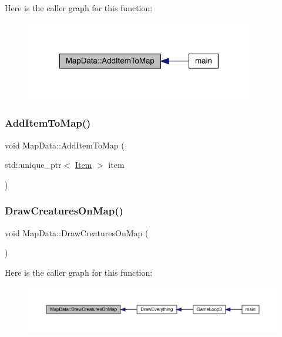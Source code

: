 Here is the caller graph for this function\+:
\nopagebreak
\begin{figure}[H]
\begin{center}
\leavevmode
\includegraphics[width=283pt]{de/d83/class_map_data_a134c2de11f90b487d30fdae6570bc256_icgraph}
\end{center}
\end{figure}
\mbox{\label{class_map_data_a27d20220e1bd6db934312f30a15dbcb0}} 
\subsubsection{\texorpdfstring{Add\+Item\+To\+Map()}{AddItemToMap()}\hspace{0.1cm}{\footnotesize\ttfamily [2/2]}}
{\footnotesize\ttfamily void Map\+Data\+::\+Add\+Item\+To\+Map (\begin{DoxyParamCaption}\item[{std\+::unique\+\_\+ptr$<$ \mbox{\hyperlink{class_item}{Item}} $>$}]{item }\end{DoxyParamCaption})}

\mbox{\label{class_map_data_ad7ff044e19425487082134fe86221d07}} 
\subsubsection{\texorpdfstring{Draw\+Creatures\+On\+Map()}{DrawCreaturesOnMap()}}
{\footnotesize\ttfamily void Map\+Data\+::\+Draw\+Creatures\+On\+Map (\begin{DoxyParamCaption}{ }\end{DoxyParamCaption})}

Here is the caller graph for this function\+:
\nopagebreak
\begin{figure}[H]
\begin{center}
\leavevmode
\includegraphics[width=350pt]{de/d83/class_map_data_ad7ff044e19425487082134fe86221d07_icgraph}
\end{center}
\end{figure}
\mbox{\label{class_map_data_a6e25b7e4936363f67f356911d46d4ef6}} 
